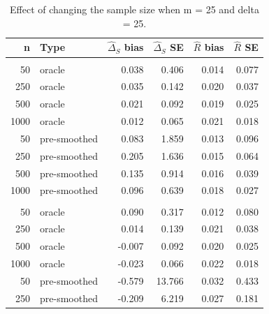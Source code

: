\documentclass[useAMS,usenatbib,referee]{biom}
\begin{document}
\begin{table}[t]

\caption{\label{tab:large-m-all-nl}Effect of changing the sample size when m = 25 and delta = 25.}
\centering
\begin{tabular}{rlrrrr}
\toprule
n & Type & $\widehat{\Delta}_S$ bias & $\widehat{\Delta}_S$ SE & $\widehat{R}$ bias & $\widehat{R}$ SE\\
\midrule
\addlinespace[0.3em]
\multicolumn{6}{l}{\textbf{GAM}}\\
\hspace{1em}50 & oracle & 0.038 & 0.406 & 0.014 & 0.077\\
\hspace{1em}250 & oracle & 0.035 & 0.142 & 0.020 & 0.037\\
\hspace{1em}500 & oracle & 0.021 & 0.092 & 0.019 & 0.025\\
\hspace{1em}1000 & oracle & 0.012 & 0.065 & 0.021 & 0.018\\
\hspace{1em}50 & pre-smoothed & 0.083 & 1.859 & 0.013 & 0.096\\
\hspace{1em}250 & pre-smoothed & 0.205 & 1.636 & 0.015 & 0.064\\
\hspace{1em}500 & pre-smoothed & 0.135 & 0.914 & 0.016 & 0.039\\
\hspace{1em}1000 & pre-smoothed & 0.096 & 0.639 & 0.018 & 0.027\\
\addlinespace[0.3em]
\multicolumn{6}{l}{\textbf{GAM-unsmoothed}}\\
\hspace{1em}50 & oracle & 0.090 & 0.317 & 0.012 & 0.080\\
\hspace{1em}250 & oracle & 0.014 & 0.139 & 0.021 & 0.038\\
\hspace{1em}500 & oracle & -0.007 & 0.092 & 0.020 & 0.025\\
\hspace{1em}1000 & oracle & -0.023 & 0.066 & 0.022 & 0.018\\
\hspace{1em}50 & pre-smoothed & -0.579 & 13.766 & 0.032 & 0.433\\
\hspace{1em}250 & pre-smoothed & -0.209 & 6.219 & 0.027 & 0.181\\

\end{tabular}
\end{table}
\end{document}
